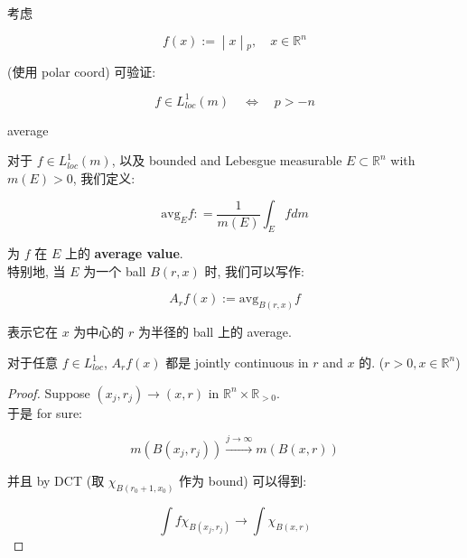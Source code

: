 \documentclass{qlnotes-export}
\begin{document}
\begin{example}\label{ex-08-hardy-littlewood-ldt-example-001}

考虑

\[\left. f(x) := \middle| x \middle| {}_{p},\quad x \in {\mathbb{R}}^{n} \right.\]

(使用 polar coord) 可验证:

\[f \in L_{loc}^{1}(m)\quad\Leftrightarrow\quad p > - n\]

\end{example}

\begin{definition}{average}\label{def-08-hardy-littlewood-ldt-average}

对于 \(f \in L_{loc}^{1}(m)\), 以及 bounded and Lebesgue measurable \(E \subset {\mathbb{R}}^{n}\) with \(m(E) > 0\), 我们定义:

\[\text{avg}_{E}f: = \frac{1}{m(E)}\int_{E}f dm\]

为 \(f\) 在 \(E\) 上的 \textbf{average value}.\\
特别地, 当 \(E\) 为一个 ball \(B(r,x)\) 时, 我们可以写作:

\[A_{r}f(x) := \text{avg}_{B(r,x)}f\]

表示它在 \(x\) 为中心的 \(r\) 为半径的 ball 上的 average.

\end{definition}

\begin{lemma}\label{lem-08-hardy-littlewood-ldt-lemma-001}

对于任意 \(f \in L_{loc}^{1}\), \(A_{r}f(x)\) 都是 jointly continuous in \(r\) and \(x\) 的. (\(r > 0,x \in {\mathbb{R}}^{n}\))

\end{lemma}

\begin{proof}

Suppose \((x_{j},r_{j})\rightarrow(x,r)\) in \({\mathbb{R}}^{n} \times {\mathbb{R}}_{> 0}\).\\
于是 for sure:

\[m(B(x_{j},r_{j}))\overset{j\rightarrow\infty}{\rightarrow}m(B(x,r))\]

并且 by DCT (取 \(\chi_{B(r_{0} + 1,x_{0})}\) 作为 bound) 可以得到:

\[\int f\chi_{B(x_{j},r_{j})}\rightarrow\int\chi_{B(x,r)}\]

\end{proof}
\end{document}

